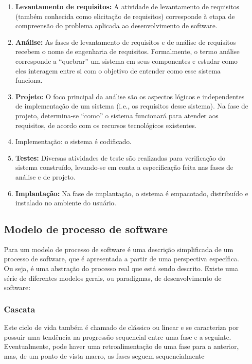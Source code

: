 \begin{enumerate}
	\item \textbf{Levantamento de requisitos:} A atividade de levantamento de requisitos (também conhecida como elicitação de requisitos) corresponde à etapa de compreensão do problema aplicada ao desenvolvimento de software.
	\item  \textbf{Análise:} As fases de levantamento de requisitos e de análise de requisitos recebem o nome de engenharia de requisitos. Formalmente, o termo análise corresponde a “quebrar” um sistema em seus componentes e estudar como eles interagem entre si com o objetivo de entender como esse sistema funciona.
	\item \textbf{Projeto:} O foco principal da análise são os aspectos lógicos e independentes de implementação de um sistema (i.e., os requisitos desse sistema). Na fase de projeto, determina-se “como” o sistema funcionará para atender aos requisitos, de acordo com os recursos tecnológicos existentes.
	\item Implementação: o sistema é codificado.
	\item \textbf{Testes:} Diversas atividades de teste são realizadas para verificação do sistema construído, levando-se em conta a especificação feita nas fases de análise e de projeto.
	\item \textbf{Implantação:} Na fase de implantação, o sistema é empacotado, distribuído e instalado no ambiente do usuário.
\end{enumerate}

\subsection{Modelo de processo de software}

Para  um modelo de processo de software é uma descrição simplificada de um processo de software, que é apresentada a partir de uma perspectiva específica. Ou seja, é uma abstração do processo real que está sendo descrito. Existe uma série de diferentes modelos gerais, ou paradigmas, de desenvolvimento de
software:

\subsubsection{Cascata}
Este ciclo de vida também é chamado de clássico ou linear e se caracteriza por possuir uma tendência na progressão sequencial entre uma fase e a seguinte. Eventualmente, pode haver uma retroalimentação de uma fase para a anterior, mas, de um ponto de vista macro, as fases seguem sequencialmente \cite{bezerra2016principios}

